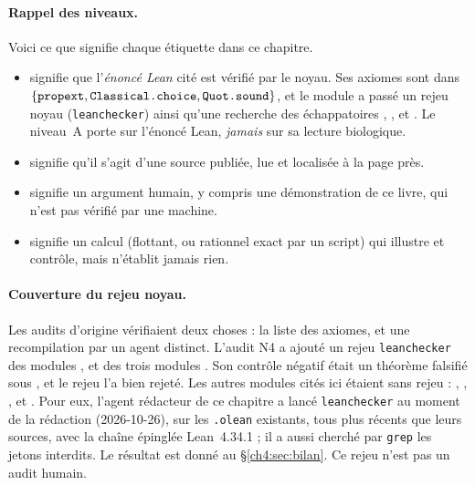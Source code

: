 \paragraph{Rappel des niveaux.} Voici ce que signifie chaque étiquette dans ce chapitre.
\begin{itemize}[itemsep=1pt]
\item \tierA{} signifie que l'\emph{énoncé Lean} cité est vérifié par le noyau. Ses axiomes sont dans
$\{\lean{propext},\lean{Classical.choice},\lean{Quot.sound}\}$, et le module a passé un rejeu noyau
(\texttt{leanchecker}) ainsi qu'une recherche des échappatoires , ,
 et . Le niveau~A porte sur l'énoncé Lean, \emph{jamais} sur sa
lecture biologique.
\item \tierL{} signifie qu'il s'agit d'une source publiée, lue et localisée à la page près.
\item \tierC{} signifie un argument humain, y compris une démonstration de ce livre, qui n'est pas vérifié par
une machine.
\item \tierX{} signifie un calcul (flottant, ou rationnel exact par un script) qui illustre et contrôle, mais
n'établit jamais rien.
\end{itemize}

\paragraph{Couverture du rejeu noyau.} Les audits d'origine vérifiaient deux choses : la liste des axiomes, et
une recompilation par un agent distinct. L'audit N4 a ajouté un rejeu \texttt{leanchecker} des modules
,  et des trois modules
. Son contrôle négatif était un théorème falsifié sous ,
et le rejeu l'a bien rejeté. Les autres modules cités ici étaient sans rejeu : ,
, ,
 et . Pour eux, l'agent rédacteur de ce
chapitre a lancé \texttt{leanchecker} au moment de la rédaction (2026-10-26), sur les \texttt{.olean} existants,
tous plus récents que leurs sources, avec la chaîne épinglée Lean~4.34.1 ; il a aussi cherché par \texttt{grep}
les jetons interdits. Le résultat est donné au §\ref{ch4:sec:bilan}. Ce rejeu n'est pas un audit humain.

